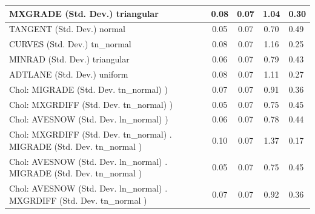 \begin{table}
\begin{center}
\begin{tabular}{|l|l|c|c|c|l|}
			\hline
			MXGRADE (Std. Dev.) triangular &  & 0.08 & 0.07 & 1.04 & 0.30 \\
			\hline
			TANGENT (Std. Dev.) normal &  & 0.05 & 0.07 & 0.70 & 0.49 \\
			\hline
			CURVES (Std. Dev.) tn_normal &  & 0.08 & 0.07 & 1.16 & 0.25 \\
			\hline
			MINRAD (Std. Dev.) triangular &  & 0.06 & 0.07 & 0.79 & 0.43 \\
			\hline
			ADTLANE (Std. Dev.) uniform &  & 0.08 & 0.07 & 1.11 & 0.27 \\
			\hline
			 Chol: MIGRADE (Std. Dev. tn_normal) ) &  & 0.07 & 0.07 & 0.91 & 0.36 \\
			\hline
			 Chol: MXGRDIFF (Std. Dev. tn_normal) ) &  & 0.05 & 0.07 & 0.75 & 0.45 \\
			\hline
			 Chol: AVESNOW (Std. Dev. ln_normal) ) &  & 0.06 & 0.07 & 0.78 & 0.44 \\
			\hline
			 Chol: MXGRDIFF (Std. Dev. tn_normal) . MIGRADE (Std. Dev.   tn_normal ) &  & 0.10 & 0.07 & 1.37 & 0.17 \\
			\hline
			 Chol: AVESNOW (Std. Dev. ln_normal) . MIGRADE (Std. Dev.   tn_normal ) &  & 0.05 & 0.07 & 0.75 & 0.45 \\
			\hline
			 Chol: AVESNOW (Std. Dev. ln_normal) . MXGRDIFF (Std. Dev.   tn_normal ) &  & 0.07 & 0.07 & 0.92 & 0.36 \\
			\hline
		\end{tabular}
	\end{center}
\end{table}